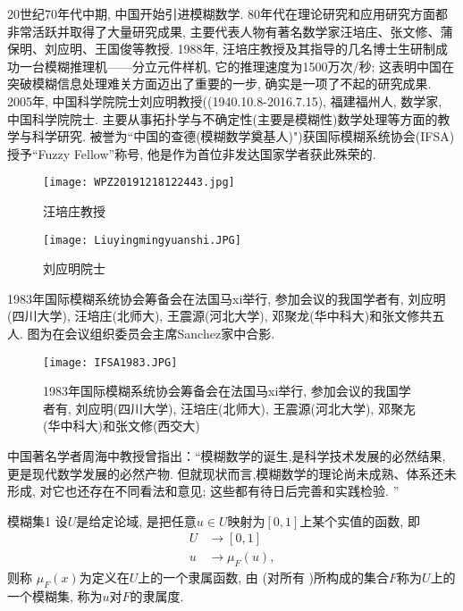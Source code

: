 20世纪70年代中期, 中国开始引进模糊数学.
80年代在理论研究和应用研究方面都非常活跃并取得了大量研究成果, 主要代表人物有著名数学家汪培庄、张文修、蒲保明、刘应明、王国俊等教授.
1988年, 汪培庄教授及其指导的几名博士生研制成功一台模糊推理机——分立元件样机, 它的推理速度为1500万次/秒; 这表明中国在突破模糊信息处理难关方面迈出了重要的一步, 确实是一项了不起的研究成果.
2005年, 中国科学院院士刘应明教授((1940.10.8-2016.7.15), 福建福州人, 数学家, 中国科学院院士.
主要从事拓扑学与不确定性(主要是模糊性)数学处理等方面的教学与科学研究. 被誉为“中国的查德(模糊数学奠基人)")获国际模糊系统协会(IFSA)授予“Fuzzy Fellow”称号, 他是作为首位非发达国家学者获此殊荣的.
\begin{figure}[H]
    \centering
    \texttt{[image: WPZ20191218122443.jpg]}
    \caption{汪培庄教授}
    \label{WPZ20191218122443}
\end{figure}
\begin{figure}[H]
    \centering
    \texttt{[image: Liuyingmingyuanshi.JPG]}
    \caption{刘应明院士}
    \label{WPZ20191218122443}
\end{figure}
1983年国际模糊系统协会筹备会在法国马xi举行, 参加会议的我国学者有, 刘应明(四川大学), 汪培庄(北师大), 王震源(河北大学), 邓聚龙(华中科大)和张文修共五人. 图为在会议组织委员会主席Sanchez家中合影.
\begin{figure}[H]
    \centering
    \texttt{[image: IFSA1983.JPG]}
    \caption{1983年国际模糊系统协会筹备会在法国马xi举行, 参加会议的我国学者有, 刘应明(四川大学), 汪培庄(北师大), 王震源(河北大学), 邓聚㔫(华中科大)和张文修(西交大)}
    \label{WPZ20191218122443}
\end{figure}
中国著名学者周海中教授曾指出：“模糊数学的诞生,是科学技术发展的必然结果, 更是现代数学发展的必然产物. 但就现状而言,模糊数学的理论尚未成熟、体系还未形成, 对它也还存在不同看法和意见; 这些都有待日后完善和实践检验. ”
\begin{mydef}{模糊集}{1}
设$U$是给定论域,   是把任意$u\in U$映射为$[0, 1]$上某个实值的函数, 即
\begin{align}
    U&\rightarrow [0, 1]\\
    u&\rightarrow \mu_F(u),
\end{align}
则称 $ \mu_F(x)$为定义在$U$上的一个隶属函数, 由   (对所有    )所构成的集合$F$称为$U$上的一个模糊集, 称为$u$对$F$的隶属度.
\end{mydef}

